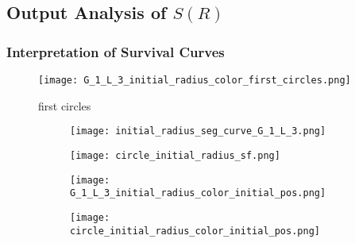 

\subsection{Output Analysis of $S(R)$}



   \subsubsection{Interpretation of Survival Curves}

     \begin{figure}
        \centering
          \texttt{[image: G\_1\_L\_3\_initial\_radius\_color\_first\_circles.png]}
          \caption{first circles}
          \label{fig:G_1_L_3_first_circles}
      \end{figure}


     \begin{figure}
        \centering
        \begin{subfigure}[b]{0.45\textwidth}
          \texttt{[image: initial\_radius\_seg\_curve\_G\_1\_L\_3.png]}
          \caption{}
          \label{fig:G_1_L_3_radius_sf}
        \end{subfigure}
        \hfill
        \begin{subfigure}[b]{0.45\textwidth}
          \texttt{[image: circle\_initial\_radius\_sf.png]}
          \caption{}
          \label{fig:circle_radius_sf}
        \end{subfigure}
        \caption{}
        \label{fig:shape_sf_radius}
     \end{figure}


     \begin{figure}
        \centering
        \begin{subfigure}[b]{0.45\textwidth}
          \texttt{[image: G\_1\_L\_3\_initial\_radius\_color\_initial\_pos.png]}
          \caption{}
          \label{fig:G_1_L_3_radius_initial_pos}
        \end{subfigure}
        \hfill
        \begin{subfigure}[b]{0.45\textwidth}
          \texttt{[image: circle\_initial\_radius\_color\_initial\_pos.png]}
          \caption{}
          \label{fig:circle_radius_initial_pos}
        \end{subfigure}
        \caption{}
        \label{fig:radius_initial_pos}
     \end{figure}

